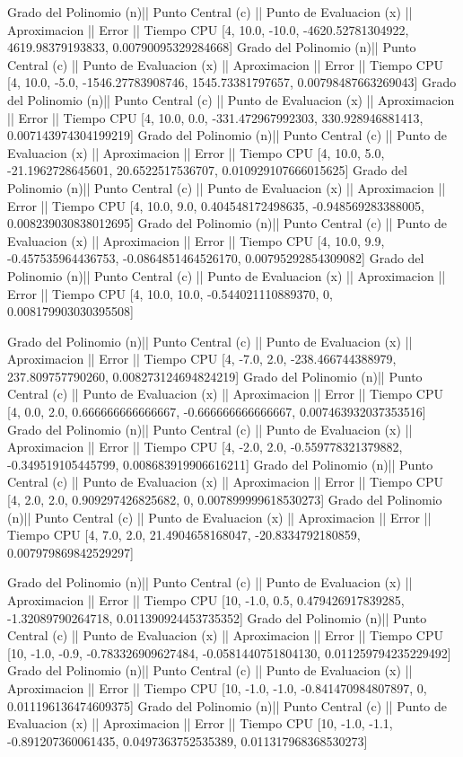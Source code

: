 Grado del Polinomio (n)|| Punto Central (c) || Punto de Evaluacion (x) || Aproximacion || Error || Tiempo CPU 
 [4, 10.0, -10.0, -4620.52781304922, 4619.98379193833, 0.00790095329284668]
Grado del Polinomio (n)|| Punto Central (c) || Punto de Evaluacion (x) || Aproximacion || Error || Tiempo CPU 
 [4, 10.0, -5.0, -1546.27783908746, 1545.73381797657, 0.00798487663269043]
Grado del Polinomio (n)|| Punto Central (c) || Punto de Evaluacion (x) || Aproximacion || Error || Tiempo CPU 
 [4, 10.0, 0.0, -331.472967992303, 330.928946881413, 0.007143974304199219]
Grado del Polinomio (n)|| Punto Central (c) || Punto de Evaluacion (x) || Aproximacion || Error || Tiempo CPU 
 [4, 10.0, 5.0, -21.1962728645601, 20.6522517536707, 0.010929107666015625]
Grado del Polinomio (n)|| Punto Central (c) || Punto de Evaluacion (x) || Aproximacion || Error || Tiempo CPU 
 [4, 10.0, 9.0, 0.404548172498635, -0.948569283388005, 0.008239030838012695]
Grado del Polinomio (n)|| Punto Central (c) || Punto de Evaluacion (x) || Aproximacion || Error || Tiempo CPU 
 [4, 10.0, 9.9, -0.457535964436753, -0.0864851464526170, 0.00795292854309082]
Grado del Polinomio (n)|| Punto Central (c) || Punto de Evaluacion (x) || Aproximacion || Error || Tiempo CPU 
 [4, 10.0, 10.0, -0.544021110889370, 0, 0.008179903030395508]

Grado del Polinomio (n)|| Punto Central (c) || Punto de Evaluacion (x) || Aproximacion || Error || Tiempo CPU 
 [4, -7.0, 2.0, -238.466744388979, 237.809757790260, 0.008273124694824219]
Grado del Polinomio (n)|| Punto Central (c) || Punto de Evaluacion (x) || Aproximacion || Error || Tiempo CPU 
 [4, 0.0, 2.0, 0.666666666666667, -0.666666666666667, 0.007463932037353516]
Grado del Polinomio (n)|| Punto Central (c) || Punto de Evaluacion (x) || Aproximacion || Error || Tiempo CPU 
 [4, -2.0, 2.0, -0.559778321379882, -0.349519105445799, 0.008683919906616211]
Grado del Polinomio (n)|| Punto Central (c) || Punto de Evaluacion (x) || Aproximacion || Error || Tiempo CPU 
 [4, 2.0, 2.0, 0.909297426825682, 0, 0.007899999618530273]
Grado del Polinomio (n)|| Punto Central (c) || Punto de Evaluacion (x) || Aproximacion || Error || Tiempo CPU 
 [4, 7.0, 2.0, 21.4904658168047, -20.8334792180859, 0.007979869842529297]

Grado del Polinomio (n)|| Punto Central (c) || Punto de Evaluacion (x) || Aproximacion || Error || Tiempo CPU 
 [10, -1.0, 0.5, 0.479426917839285, -1.32089790264718, 0.011390924453735352]
Grado del Polinomio (n)|| Punto Central (c) || Punto de Evaluacion (x) || Aproximacion || Error || Tiempo CPU 
 [10, -1.0, -0.9, -0.783326909627484, -0.0581440751804130, 0.011259794235229492]
Grado del Polinomio (n)|| Punto Central (c) || Punto de Evaluacion (x) || Aproximacion || Error || Tiempo CPU 
 [10, -1.0, -1.0, -0.841470984807897, 0, 0.011196136474609375]
Grado del Polinomio (n)|| Punto Central (c) || Punto de Evaluacion (x) || Aproximacion || Error || Tiempo CPU 
 [10, -1.0, -1.1, -0.891207360061435, 0.0497363752535389, 0.011317968368530273]

